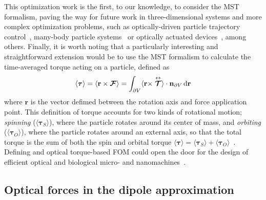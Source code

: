 This optimization work is the first, to our knowledge, to 
consider the MST formalism, paving the way for future work in three-dimensional systems and more complex optimization problems, such as optically-driven particle
trajectory control~\cite{zemanek_perspective_2019, macdonald_microfluidic_2003, shilkin_directional_2017}, many-body particle systems~\cite{bechinger_active_2016, chang_colloquium_2018} or optically actuated devices~\cite{ivanyi_optically_2024}, among others.
Finally, it is worth noting that a particularly interesting and straightforward extension would be to use the MST formalism to calculate the time-averaged torque acting on a particle, defined as~\cite{novotny}
\begin{equation}
    \langle \bm{\tau} \rangle = \langle \mathbf{r} \times \bm{\mathcal{F}} \rangle = \int_{\partial V} \langle \mathbf{r}
     \times \stackrel{\leftrightarrow}{\bm{\mathcal{T}}} \rangle \cdot \mathbf{n}_{\partial V} \mathop{}\!\text{d}\mathbf{r} 
\end{equation}
where $\mathbf{r}$ is the vector defimed between the rotation axis and force application point. This definition of torque accounts
for two kinds of rotational motion; \textit{spinning} ($\langle \bm{\tau}_S \rangle$), where the particle rotates around its center of mass,
and \textit{orbiting} ($\langle \bm{\tau}_O \rangle$), where the particle rotates around an external axis, so that the total torque is the sum
of both the spin and orbital torque $\langle \bm{\tau} \rangle = \langle \bm{\tau}_S \rangle + \langle \bm{\tau}_O \rangle$~\cite{torque}.  Defining
and optical torque-based FOM could open the door for the design of efficient optical and biological micro- and nanomachines~\cite{rotating}.

\subsection*{Optical forces in the dipole approximation~\cite{ownpub1, ownpub3}}

